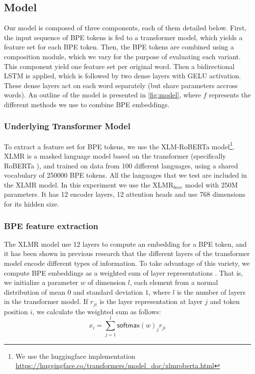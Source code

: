 \documentclass[11pt]{article}
\newcommand\adam[1]{(\textbf{Adam:} #1)}
\newcommand\citep{\cite}
\newcommand\softmax{\mathsf{softmax}}
\begin{document}
	\subsection{Model}

        Our model is composed of three components, each of them
        detailed below. First, the input sequence of BPE tokens is fed
        to a transformer model, which yields a feature set for each
        BPE token. Then, the BPE tokens are combined using a
        composition module, which we vary for the purpose of
        evaluating each variant. This component yield one feature set
        per original word. Then a bidirectional LSTM is applied, which
        is followed by two dense layers with GELU \citep{hendrycks2016gaussian}
        activation. These dense layers act on each word separately (but
        share parameters accross words).  An outline of the model is
        presented in \cref{fig:model}, where $f$ represents the
        different methods we use to combine BPE embeddings.

	\subsubsection{Underlying Transformer Model}
         To extract a feature set for BPE tokens, we use the
     XLM-RoBERTa \cite{conneau2019unsupervised} model\footnote{We use
     the huggingface implementation
     \url{https://huggingface.co/transformers/model_doc/xlmroberta.html}}. XLMR
     is a masked language model based on the transformer (specifically
     RoBERTa \citep{liu2019roberta}), and trained on data from 100
     different languages, using a shared vocabulary of 250000 BPE
     tokens. All the languages that we test are included in the XLMR
     model. In this experiment we use the \textsc{XLMR}$_{base}$ model
     with 250M parameters. It has 12 encoder layers, 12 attention
     heads and use 768 dimensions for its hidden size.

	\subsubsection{BPE feature extraction}
        \label{sec:bpe-features}

                    The XLMR model use 12 layers to compute an
     embedding for a BPE token, and it has been shown in previous
     research
     \citep{kondratyukstraka,raganato2018analysis,liu2019linguistic}
     that the different layers of the transformer model encode
     different types of information. To take advantage of this
     variety, we compute BPE embeddings as a weighted sum of layer
     representations \citep{kondratyukstraka}.  That is, we initialize
     a parameter $w$ of dimension $l$, each element from a normal
     distribution of mean $0$ and standard deviation $1$, where $l$ is
     the number of layers in the transformer model. If $r_{ji}$ is the
     layer representation at layer $j$ and token position $i$, we
     calculate the weighted sum as follows:
    \begin{equation}
		x_i = \sum_{j=1}^{l} \softmax(w)_j r_{ji}
	\end{equation}
\end{document}
